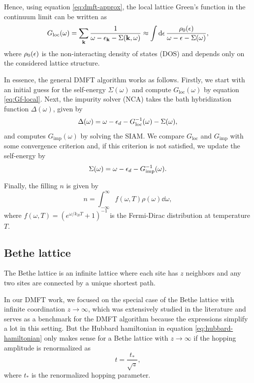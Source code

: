 \documentclass[12pt]{report}
\begin{document}
Hence, using equation \ref{eq:dmft-approx}, the local lattice Green's function in the continuum limit can be written as
\begin{equation} \label{eq:Gf-local}
G_{\text{loc}}(\omega) = \sum_{{\vb{k}}} \frac{1}{\omega-\epsilon_{\vb{k}}-\Sigma({\vb{k}}, \omega)} \approx
\int \dd{\epsilon} \frac{\rho_0(\epsilon)}{\omega - \epsilon - \Sigma(\omega)},
\end{equation}
where $\rho_0(\epsilon)$ is the non-interacting density of states (DOS) and depends only on the considered lattice structure.

In essence, the general DMFT algorithm works as follows. Firstly, we start with an initial guess for the self-energy $\Sigma(\omega)$ and compute $G_{\text{loc}}(\omega)$ by equation \ref{eq:Gf-local}. Next, the impurity solver (NCA) takes the bath hybridization function $\Delta(\omega)$, given by
\begin{equation} \label{eq:hybridization-func}
\Delta(\omega) = \omega - \epsilon_d - G_{\text{loc}}^{-1}(\omega) - \Sigma(\omega),
\end{equation}
and computes $G_{\text{imp}}(\omega)$ by solving the SIAM. We compare $G_{\text{loc}}$ and $G_{\text{imp}}$ with some convergence criterion and, if this criterion is not satisfied, we update the self-energy by
\begin{equation} \label{eq:self-energy-update}
\Sigma(\omega) = \omega - \epsilon_d - G_{\text{imp}}^{-1}(\omega).
\end{equation}

Finally, the filling $n$ is given by \cite{bruus}
\begin{equation} \label{eq:filling}
n = \int_{-\infty}^{\infty} f(\omega, T) \rho(\omega) \dd{\omega},
\end{equation}
where $f(\omega, T) = (e^{\omega/k_B T} + 1)^{-1}$ is the Fermi-Dirac distribution at temperature $T$.

\subsection{Bethe lattice} \label{sec:bethe}

The Bethe lattice is an infinite lattice where each site has $z$ neighbors and any two sites are connected by a unique shortest path.

In our DMFT work, we focused on the special case of the Bethe lattice with infinite coordination $z\to\infty$, which was extensively studied in the literature \cite{georges1996, thesis_dmft_graz} and serves as a benchmark for the DMFT algorithm because the expressions simplify a lot in this setting. But the Hubbard hamiltonian in equation \ref{eq:hubbard-hamiltonian} only makes sense for a Bethe lattice with $z\to\infty$ if the hopping amplitude is renormalized as \cite{thesis_bruno}
\begin{equation} \label{eq:hopping-renormalization}
t = \frac{t_*}{\sqrt{z}},
\end{equation}
where $t_*$ is the renormalized hopping parameter.
\end{document}
